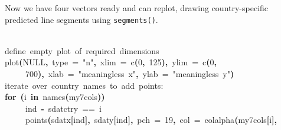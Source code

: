\documentclass[a4paper]{article}
\newcommand{\hlnumber}[1]{\textcolor[rgb]{0.0823529411764706,0.0784313725490196,0.709803921568627}{#1}}%
\newcommand{\hlfunctioncall}[1]{\textcolor[rgb]{1,0,0}{#1}}%
\newcommand{\hlstring}[1]{\textcolor[rgb]{0.6,0.6,1}{#1}}%
\newcommand{\hlkeyword}[1]{\textcolor[rgb]{0,0,0}{\textbf{#1}}}%
\newcommand{\hlargument}[1]{\textcolor[rgb]{0.694117647058824,0.247058823529412,0.0196078431372549}{#1}}%
\newcommand{\hlcomment}[1]{\textcolor[rgb]{0.8,0.8,0.8}{#1}}%
\newcommand{\hlassignement}[1]{\textcolor[rgb]{0.215686274509804,0.215686274509804,0.384313725490196}{\textbf{#1}}}%
\newcommand{\hlsymbol}[1]{\textcolor[rgb]{0,0,0}{#1}}%
\newcommand{\hlprompt}[1]{\textcolor[rgb]{0,0,0}{#1}}%
\newcommand{\hlstd}[1]{\textcolor[rgb]{0,0,0}{#1}}%
\newenvironment{Houtput}{\raggedright}{%
%
}
\begin{document}
Now we have four vectors ready and can replot, drawing country-specific predicted line segments using \texttt{segments()}.

\begin{Houtput}
\hspace*{\fill}\\
\hlstd{}\ttfamily\noindent
\hlprompt{\usebox{\hlnormalsizeboxgreaterthan}{\ }}\hlcomment{\usebox{\hlnormalsizeboxhash}{\ }define{\ }empty{\ }plot{\ }of{\ }required{\ }dimensions}\mbox{}
\normalfont
\hspace*{\fill}\\
\hlstd{}\ttfamily\noindent
\hlprompt{\usebox{\hlnormalsizeboxgreaterthan}{\ }}\hlfunctioncall{plot}\hlkeyword{(}NULL\hlkeyword{,}{\ }\hlargument{type}{\ }\hlargument{=}{\ }\hlstring{"n"}\hlkeyword{,}{\ }\hlargument{xlim}{\ }\hlargument{=}{\ }\hlfunctioncall{c}\hlkeyword{(}\hlnumber{0}\hlkeyword{,}{\ }\hlnumber{125}\hlkeyword{)}\hlkeyword{,}{\ }\hlargument{ylim}{\ }\hlargument{=}{\ }\hlfunctioncall{c}\hlkeyword{(}\hlnumber{0}\hlkeyword{,}\hspace*{\fill}\\
\hlstd{}\hlprompt{{\ }}{\ }{\ }{\ }{\ }\hlnumber{700}\hlkeyword{)}\hlkeyword{,}{\ }\hlargument{xlab}{\ }\hlargument{=}{\ }\hlstring{"meaningless{\ }x"}\hlkeyword{,}{\ }\hlargument{ylab}{\ }\hlargument{=}{\ }\hlstring{"meaningless{\ }y"}\hlkeyword{)}\mbox{}
\normalfont
\hspace*{\fill}\\
\hlstd{}\ttfamily\noindent
\hlprompt{\usebox{\hlnormalsizeboxgreaterthan}{\ }}\hlcomment{\usebox{\hlnormalsizeboxhash}{\ }iterate{\ }over{\ }country{\ }names{\ }to{\ }add{\ }points:}\mbox{}
\normalfont
\hspace*{\fill}\\
\hlstd{}\ttfamily\noindent
\hlprompt{\usebox{\hlnormalsizeboxgreaterthan}{\ }}\hlkeyword{for}{\ }\hlkeyword{(}\hlsymbol{i}{\ }\hlkeyword{in}{\ }\hlfunctioncall{names}\hlkeyword{(}\hlsymbol{my7cols}\hlkeyword{)}\hlkeyword{)}{\ }\hlkeyword{\usebox{\hlnormalsizeboxopenbrace}}\hspace*{\fill}\\
\hlstd{}\hlprompt{{\ }}{\ }{\ }{\ }{\ }\hlsymbol{ind}{\ }\hlassignement{\usebox{\hlnormalsizeboxlessthan}-}{\ }\hlsymbol{sdat}\hlkeyword{\usebox{\hlnormalsizeboxdollar}}\hlsymbol{ctry}{\ }=={\ }\hlsymbol{i}\hspace*{\fill}\\
\hlstd{}\hlprompt{{\ }}{\ }{\ }{\ }{\ }\hlfunctioncall{points}\hlkeyword{(}\hlsymbol{sdat}\hlkeyword{\usebox{\hlnormalsizeboxdollar}}\hlsymbol{x}\hlkeyword{[}\hlsymbol{ind}\hlkeyword{]}\hlkeyword{,}{\ }\hlsymbol{sdat}\hlkeyword{\usebox{\hlnormalsizeboxdollar}}\hlsymbol{y}\hlkeyword{[}\hlsymbol{ind}\hlkeyword{]}\hlkeyword{,}{\ }\hlargument{pch}{\ }\hlargument{=}{\ }\hlnumber{19}\hlkeyword{,}{\ }\hlargument{col}{\ }\hlargument{=}{\ }\hlfunctioncall{colalpha}\hlkeyword{(}\hlsymbol{my7cols}\hlkeyword{[}\hlsymbol{i}\hlkeyword{]}\hlkeyword{,}\hspace*{\fill}\\

\end{Houtput}
\end{document}

